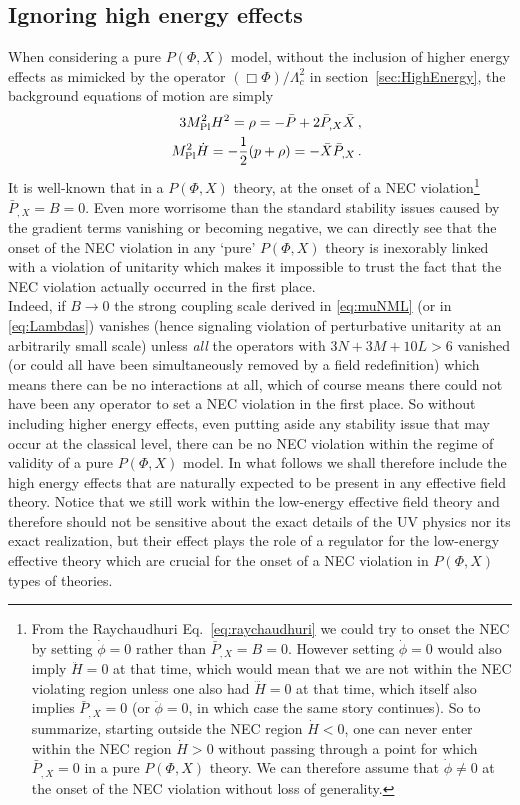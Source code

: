 \documentclass[12pt]{article}
\def\ba{\begin{eqnarray}}
\def\ea{\end{eqnarray}}
\def\mpl{M_{\rm Pl}}
\begin{document}
\subsection{Ignoring high energy effects}

When considering a pure $P(\Phi,X)$ model, without the inclusion of higher energy effects as mimicked by the operator $(\Box \Phi)/\Lambda_c^2$ in section~\ref{sec:HighEnergy}, the background equations of motion are simply
\ba
\label{eq:FriedPX}
&& 3 \mpl^2 H^2 = \rho = - \bar P + 2\bar P_{,X} \bar X \, , \\
&& \mpl^2 \dot H = -\frac 12 (p+\rho)= - \bar X \bar P_{,X} \,.
\label{eq:raychaudhuri}
\ea
It is well-known that in a $P(\Phi,X)$ theory, at the onset of a NEC violation\footnote{From the Raychaudhuri Eq.~\eqref{eq:raychaudhuri} we could try to onset the NEC by setting $\dot{\phi}=0$ rather than $\bar P_{, X} = B = 0$. However setting  $\dot{\phi}=0$  would also imply $\ddot H=0$ at that time, which would mean that we are not within the NEC violating region unless one also had $\dddot H=0$ at that time, which itself also implies $\bar P_{, X}=0$ (or $\ddot{\phi}=0$, in which case the same story continues). So to summarize, starting outside the NEC region $\dot H<0$, one can never enter within the NEC region $\dot H>0$ without passing through a point for which $\bar P_{, X} =0$ in a pure $P(\Phi,X)$ theory. We can therefore assume that $\dot{\phi}\ne 0$ at the onset of the NEC violation without loss of generality.}  $\bar P_{, X} = B = 0$. Even more worrisome than the standard stability issues caused by the gradient terms vanishing or becoming negative, we can directly see that the onset of the NEC violation in any `pure' $P(\Phi,X)$ theory is inexorably linked with a violation of unitarity which makes it impossible to trust the fact that the NEC violation actually occurred in the first place. \\

Indeed, if $B\to 0$ the strong coupling scale derived in \eqref{eq:muNML} (or in \eqref{eq:Lambdas}) vanishes (hence signaling violation of perturbative unitarity at an arbitrarily small scale) unless {\it all} the operators with $3N+3M+10L>6$ vanished (or could all have been simultaneously removed by a field redefinition) which means there can be no interactions at all, which of course means there could not have been any operator to set a NEC violation in the first place. So without including higher energy effects, even putting aside any stability issue that may occur at the classical level, there can be no NEC violation within the regime of validity of a pure $P(\Phi, X)$ model.  In what follows we shall therefore include the high energy effects that are naturally expected to be present in any effective field theory. Notice that we still work within the low-energy effective field theory and therefore should not be sensitive about the exact details of the UV physics nor its exact realization, but their effect plays the role of a regulator for the low-energy effective theory which are crucial for the onset of a NEC violation in $P(\Phi,X)$ types of theories.
\end{document}
